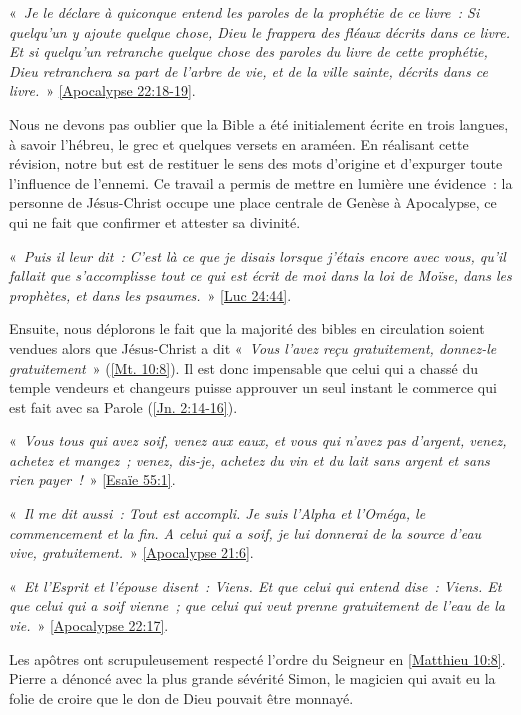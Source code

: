 \begin{small}
«~\emph{Je le déclare à quiconque entend les paroles de la prophétie de ce livre~: Si quelqu'un y ajoute quelque chose, Dieu le frappera des fléaux décrits dans ce livre. Et si quelqu'un retranche quelque chose des paroles du livre de cette prophétie, Dieu retranchera sa part de l'arbre de vie, et de la ville sainte, décrits dans ce livre.}~» \vref{Apocalypse 22:18-19}.

Nous ne devons pas oublier que la Bible a été initialement écrite en trois langues, à savoir l'hébreu, le grec et quelques versets en araméen. En réalisant cette révision, notre but est de restituer le sens des mots d'origine et d'expurger toute l'influence de l'ennemi. Ce travail a permis de mettre en lumière une évidence~: la personne de Jésus-Christ occupe une place centrale de Genèse à Apocalypse, ce qui ne fait que confirmer et attester sa divinité.

«~\emph{Puis il leur dit~: C'est là ce que je disais lorsque j'étais encore avec vous, qu'il fallait que s'accomplisse tout ce qui est écrit de moi dans la loi de Moïse, dans les prophètes, et dans les psaumes.}~» \vref{Luc 24:44}.

Ensuite, nous déplorons le fait que la majorité des bibles en circulation soient vendues alors que Jésus-Christ a dit «~\emph{Vous l'avez reçu gratuitement, donnez-le gratuitement}~» (\vref{Mt. 10:8}). Il est donc impensable que celui qui a chassé du temple vendeurs et changeurs puisse approuver un seul instant le commerce qui est fait avec sa Parole (\vref{Jn. 2:14-16}).

«~\emph{Vous tous qui avez soif, venez aux eaux, et vous qui n'avez pas d'argent, venez, achetez et mangez~; venez, dis-je, achetez du vin et du lait sans argent et sans rien payer~!}~» \vref{Esaïe 55:1}.

«~\emph{Il me dit aussi~: Tout est accompli. Je suis l'Alpha et l'Oméga, le commencement et la fin. A celui qui a soif, je lui donnerai de la source d'eau vive, gratuitement.}~» \vref{Apocalypse 21:6}.

«~\emph{Et l'Esprit et l'épouse disent~: Viens. Et que celui qui entend dise~: Viens. Et que celui qui a soif vienne~; que celui qui veut prenne gratuitement de l'eau de la vie.}~» \vref{Apocalypse 22:17}.

Les apôtres ont scrupuleusement respecté l'ordre du Seigneur en \vref{Matthieu 10:8}. Pierre a dénoncé avec la plus grande sévérité Simon, le magicien qui avait eu la folie de croire que le don de Dieu pouvait être monnayé. 


\end{small}
